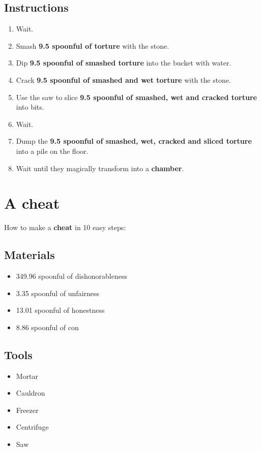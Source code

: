 \documentclass{article}
\begin{document}
\subsection{Instructions}\begin{enumerate}
\item 
Wait.
\item 
Smash \textbf{9.5 spoonful of torture} with the stone.
\item 
Dip \textbf{9.5 spoonful of smashed torture} into the bucket with water.
\item 
Crack \textbf{9.5 spoonful of smashed and wet torture} with the stone.
\item 
Use the saw to slice \textbf{9.5 spoonful of smashed, wet and cracked torture} into bits.
\item 
Wait.
\item 
Dump the \textbf{9.5 spoonful of smashed, wet, cracked and sliced torture} into a pile on the floor.
\item 
Wait until they magically transform into a \textbf{chamber}.
\end{enumerate}
\newpage
\section{A cheat}How to make a \textbf{cheat} in 10 easy steps:

\subsection{Materials}\begin{itemize}
\item 
349.96 spoonful of dishonorableness
\item 
3.35 spoonful of unfairness
\item 
13.01 spoonful of honestness
\item 
8.86 spoonful of con
\end{itemize}
\subsection{Tools}\begin{itemize}
\item 
Mortar
\item 
Cauldron
\item 
Freezer
\item 
Centrifuge
\item 
Saw
\end{itemize}
\end{document}
